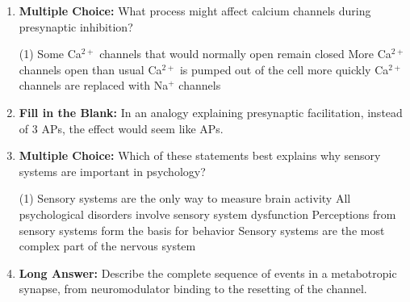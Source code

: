 \begin{enumerate}[label=\textbf{Q2.8.\arabic*}]
      \item \textbf{Multiple Choice:} What process might affect calcium channels during presynaptic inhibition?
            \begin{tasks}[label=\textcolor{draculafg}{(\Alph*)}, item-format=\color{draculafg}, label-width=1.5em, item-indent=1.7em](1)
                  \task Some Ca\(^{2+}\) channels that would normally open remain closed
                  \task More Ca\(^{2+}\) channels open than usual
                  \task Ca\(^{2+}\) is pumped out of the cell more quickly
                  \task Ca\(^{2+}\) channels are replaced with Na\(^{+}\) channels
            \end{tasks}
            
      \item \textbf{Fill in the Blank:} In an analogy explaining presynaptic facilitation, instead of 3 APs, the effect would seem like \underline{\hspace{3cm}} APs. \\

      \item \textbf{Multiple Choice:} Which of these statements best explains why sensory systems are important in psychology?
            \begin{tasks}[label=\textcolor{draculafg}{(\Alph*)}, item-format=\color{draculafg}, label-width=1.5em, item-indent=1.7em](1)
                  \task Sensory systems are the only way to measure brain activity
                  \task All psychological disorders involve sensory system dysfunction
                  \task Perceptions from sensory systems form the basis for behavior
                  \task Sensory systems are the most complex part of the nervous system
            \end{tasks}
            
      \item \textbf{Long Answer:} Describe the complete sequence of events in a metabotropic synapse, from neuromodulator binding to the resetting of the channel. \\[1in]
\end{enumerate}

